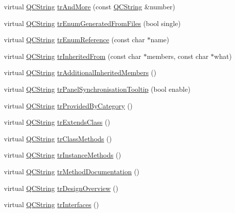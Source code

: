\begin{DoxyCompactItemize}
\item 
virtual \hyperlink{class_q_c_string}{Q\-C\-String} \hyperlink{class_translator_russian_a391327398836ee03f1d00415b80cb997}{tr\-And\-More} (const \hyperlink{class_q_c_string}{Q\-C\-String} \&number)
\item 
virtual \hyperlink{class_q_c_string}{Q\-C\-String} \hyperlink{class_translator_russian_a2039b9a9624800366462f980e8ebce70}{tr\-Enum\-Generated\-From\-Files} (bool single)
\item 
virtual \hyperlink{class_q_c_string}{Q\-C\-String} \hyperlink{class_translator_russian_a0209ef4cc7768fc9abf62f7ffc95534e}{tr\-Enum\-Reference} (const char $\ast$name)
\item 
virtual \hyperlink{class_q_c_string}{Q\-C\-String} \hyperlink{class_translator_russian_af8b8b1bb56a7ea74b11dad76e644968e}{tr\-Inherited\-From} (const char $\ast$members, const char $\ast$what)
\item 
virtual \hyperlink{class_q_c_string}{Q\-C\-String} \hyperlink{class_translator_russian_a62da1a83afa60109108fba6ad327a06f}{tr\-Additional\-Inherited\-Members} ()
\item 
virtual \hyperlink{class_q_c_string}{Q\-C\-String} \hyperlink{class_translator_russian_a1800c322fe577f6dfab2ab8eb463a78e}{tr\-Panel\-Synchronisation\-Tooltip} (bool enable)
\item 
virtual \hyperlink{class_q_c_string}{Q\-C\-String} \hyperlink{class_translator_russian_a48bb5cf8c4d20b9215921504ca43c8cf}{tr\-Provided\-By\-Category} ()
\item 
virtual \hyperlink{class_q_c_string}{Q\-C\-String} \hyperlink{class_translator_russian_a943bb1d0d3cf3c3ddca3616c21f815da}{tr\-Extends\-Class} ()
\item 
virtual \hyperlink{class_q_c_string}{Q\-C\-String} \hyperlink{class_translator_russian_a00e0dc60db9c989dad1bc310b4bdf08c}{tr\-Class\-Methods} ()
\item 
virtual \hyperlink{class_q_c_string}{Q\-C\-String} \hyperlink{class_translator_russian_ac194051c0538db0a70504f6d11fbf9b7}{tr\-Instance\-Methods} ()
\item 
virtual \hyperlink{class_q_c_string}{Q\-C\-String} \hyperlink{class_translator_russian_a4666cdb4ca29df1818744d88fc17e619}{tr\-Method\-Documentation} ()
\item 
virtual \hyperlink{class_q_c_string}{Q\-C\-String} \hyperlink{class_translator_russian_a5aeee72580ed889d0f0253be39800cc8}{tr\-Design\-Overview} ()
\item 
virtual \hyperlink{class_q_c_string}{Q\-C\-String} \hyperlink{class_translator_russian_a3e32b2fdb1d61783cd0fa4734beed3da}{tr\-Interfaces} ()

\end{DoxyCompactItemize}

